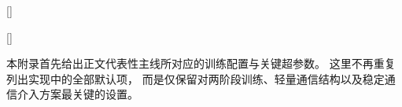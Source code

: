 


\titleformat{\section}[hang]{\xiaosan}{}{0em}{\thesection\quad}[]
\titleformat{\subsection}{\sihao}{}{0em}{\thesubsection\quad}[]


本附录首先给出正文代表性主线所对应的训练配置与关键超参数。
这里不再重复列出实现中的全部默认项，
而是仅保留对两阶段训练、轻量通信结构以及稳定通信介入方案最关键的设置。


